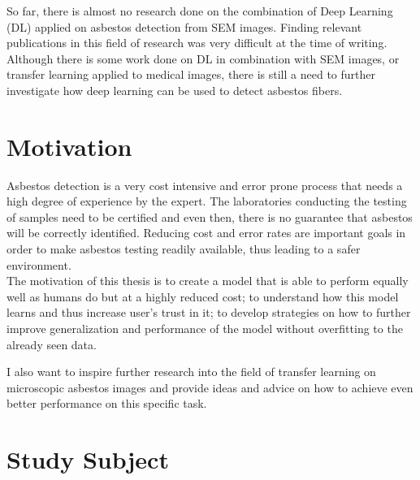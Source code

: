 So far, there is almost no research done on the combination of Deep Learning (DL) applied on asbestos detection from SEM images. Finding relevant publications in this field of research was very difficult at the time of writing. Although there is some work done on DL in combination with SEM images, or transfer learning applied to medical images, there is still a need to further investigate how deep learning can be used to detect asbestos fibers.\\



\section{Motivation}

Asbestos detection is a very cost intensive and error prone process that needs a high degree of experience by the expert. The laboratories conducting the testing of samples need to be certified and even then, there is no guarantee that asbestos will be correctly identified. Reducing cost and error rates are important goals in order to make asbestos testing readily available, thus leading to a safer environment.\\

The motivation of this thesis is to create a model that is able to perform equally well as humans do but at a highly reduced cost; to understand how this model learns and thus increase user's trust in it; to develop strategies on how to further improve generalization and performance of the model without overfitting to the already seen data. \\

\newpage

I also want to inspire further research into the field of transfer learning on microscopic asbestos images and provide ideas and advice on how to achieve even better performance on this specific task.\\


\section{Study Subject}


